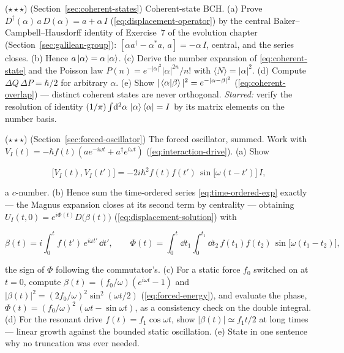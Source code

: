 \begin{problemset}
\item ($\star\star\star$) (Section~\ref{sec:coherent-states}) Coherent-state BCH. (a) Prove $D^\dagger(\alpha)\,a\,D(\alpha) = a + \alpha\,I$ (\eqref{eq:displacement-operator}) by the central Baker--Campbell--Hausdorff identity of Exercise~7 of the evolution chapter (Section~\ref{sec:galilean-group}): $[\alpha a^\dagger - \alpha^{*}a,\, a] = -\alpha\,I$, central, and the series closes. (b) Hence $a\ket{\alpha} = \alpha\ket{\alpha}$. (c) Derive the number expansion of \eqref{eq:coherent-state} and the Poisson law $P(n) = e^{-|\alpha|^2}|\alpha|^{2n}/n!$ with $\langle N\rangle = |\alpha|^2$. (d) Compute $\Delta Q\,\Delta P = \hbar/2$ for arbitrary $\alpha$. (e) Show $|\braket{\alpha|\beta}|^2 = e^{-|\alpha - \beta|^2}$ (\eqref{eq:coherent-overlap}) --- distinct coherent states are never orthogonal. \emph{Starred:} verify the resolution of identity $(1/\pi)\int\!\mathrm{d}^2\alpha\,\ket{\alpha}\bra{\alpha} = I$ by its matrix elements on the number basis.

\item ($\star\star\star$) (Section~\ref{sec:forced-oscillator}) The forced oscillator, summed. Work with $V_I(t) = -\hbar f(t)(ae^{-i\omega t} + a^\dagger e^{i\omega t})$ (\eqref{eq:interaction-drive}). (a) Show
\begin{linenomath}
    \begin{equation*}
        \bigl[V_I(t), V_I(t')\bigr] = -2i\hbar^2 f(t)f(t')\,\sin\bigl[\omega(t - t')\bigr]\,I ,
    \end{equation*}
\end{linenomath}
a $c$-number. (b) Hence sum the time-ordered series \eqref{eq:time-ordered-exp} exactly --- the Magnus expansion closes at its second term by centrality --- obtaining $U_I(t, 0) = e^{i\Phi(t)}D\bigl(\beta(t)\bigr)$ (\eqref{eq:displacement-solution}) with
\begin{linenomath}
    \begin{equation*}
        \beta(t) = i\int_0^t f(t')\,e^{i\omega t'}\,\dd t',
        \qquad
        \Phi(t) = \int_0^t\!\dd t_1\!\int_0^{t_1}\!\dd t_2\,f(t_1)f(t_2)\,\sin\bigl[\omega(t_1 - t_2)\bigr] ,
    \end{equation*}
\end{linenomath}
the sign of $\Phi$ following the commutator's. (c) For a static force $f_0$ switched on at $t = 0$, compute $\beta(t) = (f_0/\omega)(e^{i\omega t} - 1)$ and $|\beta(t)|^2 = (2f_0/\omega)^2\sin^2(\omega t/2)$ (\eqref{eq:forced-energy}), and evaluate the phase, $\Phi(t) = (f_0/\omega)^2\,(\omega t - \sin\omega t)$, as a consistency check on the double integral. (d) For the resonant drive $f(t) = f_1\cos\omega t$, show $|\beta(t)| \simeq f_1 t/2$ at long times --- linear growth against the bounded static oscillation. (e) State in one sentence why no truncation was ever needed.


\end{problemset}

